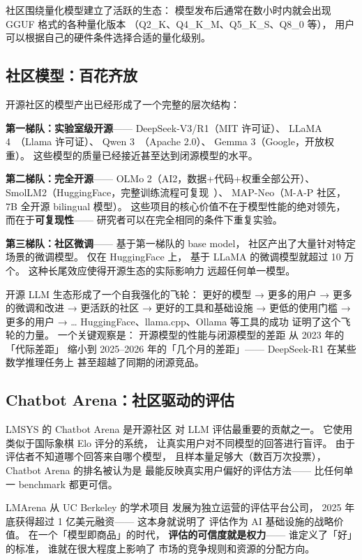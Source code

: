社区围绕量化模型建立了活跃的生态：
模型发布后通常在数小时内就会出现
GGUF 格式的各种量化版本
（Q2\_K、Q4\_K\_M、Q5\_K\_S、Q8\_0 等），
用户可以根据自己的硬件条件选择合适的量化级别。

\subsection{社区模型：百花齐放}

开源社区的模型产出已经形成了一个完整的层次结构：

\textbf{第一梯队：实验室级开源}——
DeepSeek-V3/R1（MIT 许可证）、
LLaMA 4~\cite{dubey2024llama3}（Llama 许可证）、
Qwen 3~\cite{qwen2025qwen3}（Apache 2.0）、
Gemma 3（Google，开放权重）。
这些模型的质量已经接近甚至达到闭源模型的水平。

\textbf{第二梯队：完全开源}——
OLMo 2（AI2，数据+代码+权重全部公开）、
SmolLM2（HuggingFace，完整训练流程可复现~\cite{allal2025smollm2}）、
MAP-Neo（M-A-P 社区，7B 全开源 bilingual 模型）。
这些项目的核心价值不在于模型性能的绝对领先，
而在于\textbf{可复现性}——
研究者可以在完全相同的条件下重复实验。

\textbf{第三梯队：社区微调}——
基于第一梯队的 base model，
社区产出了大量针对特定场景的微调模型。
仅在 HuggingFace 上，
基于 LLaMA 的微调模型就超过 10 万个。
这种长尾效应使得开源生态的实际影响力
远超任何单一模型。

\begin{whybox}
开源 LLM 生态形成了一个自我强化的飞轮：
更好的模型 → 更多的用户 → 更多的微调和改进
→ 更活跃的社区 → 更好的工具和基础设施
→ 更低的使用门槛 → 更多的用户 → \ldots
HuggingFace、llama.cpp、Ollama 等工具的成功
证明了这个飞轮的力量。
一个关键观察是：
开源模型的性能与闭源模型的差距
从 2023 年的「代际差距」
缩小到 2025--2026 年的「几个月的差距」——
DeepSeek-R1 在某些数学推理任务上
甚至超越了同期的闭源竞品。
\end{whybox}

\subsection{Chatbot Arena：社区驱动的评估}

LMSYS 的 Chatbot Arena 是开源社区
对 LLM 评估最重要的贡献之一。
它使用类似于国际象棋 Elo 评分的系统，
让真实用户对不同模型的回答进行盲评。
由于评估者不知道哪个回答来自哪个模型，
且样本量足够大（数百万次投票），
Chatbot Arena 的排名被认为是
最能反映真实用户偏好的评估方法——
比任何单一 benchmark 都更可信。

LMArena 从 UC Berkeley 的学术项目
发展为独立运营的评估平台公司，
2025 年底获得超过 1 亿美元融资——
这本身就说明了
评估作为 AI 基础设施的战略价值。
在一个「模型即商品」的时代，
\textbf{评估的可信度就是权力}——
谁定义了「好」的标准，
谁就在很大程度上影响了
市场的竞争规则和资源的分配方向。

